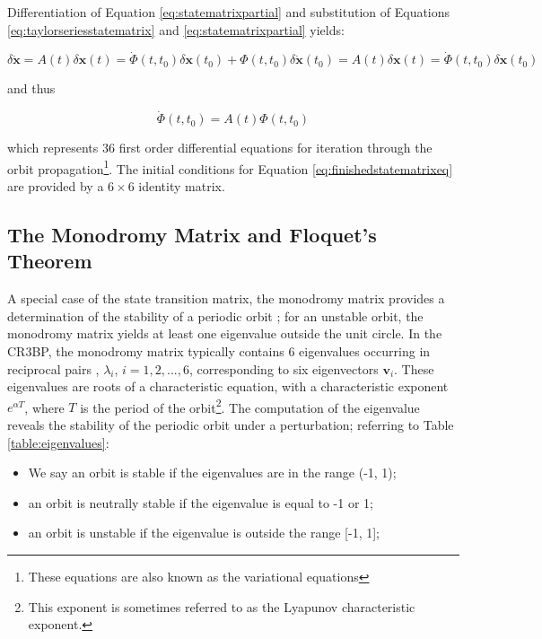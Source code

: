 \noindent Differentiation of Equation \ref{eq:statematrixpartial} and substitution of Equations \ref{eq:taylorseriesstatematrix} and \ref{eq:statematrixpartial} yields:

\begin{equation}
\delta \pmb{\dot{x}} = A \left( t \right) \delta \pmb{x} \left( t \right) = \dot{\Phi}\left(t, t_0\right) \delta \pmb{x} \left( t_0 \right) + \Phi \left(t, t_0\right) \delta\pmb{\dot{x}}\left(t_0\right) = A \left( t \right) \delta \pmb{x} \left( t \right) = \dot{\Phi}\left(t, t_0\right) \delta \pmb{x} \left( t_0 \right)
\end{equation}

\noindent and thus

\begin{equation}\label{eq:finishedstatematrixeq}
\dot{\Phi} \left( t, t_0 \right) = A\left( t\right)\Phi(t, t_0)
\end{equation}

\noindent which represents 36 first order differential equations for iteration through the orbit propagation\footnote{These equations are also known as the variational equations}. The initial conditions for Equation \ref{eq:finishedstatematrixeq} are provided by a $6\times 6$ identity matrix.

\subsection{The Monodromy Matrix and Floquet's Theorem}

A special case of the state transition matrix, the monodromy matrix provides a determination of the stability of a periodic orbit \citep{Russell2006}; for an unstable orbit, the monodromy matrix yields at least one eigenvalue outside the unit circle. In the CR3BP, the monodromy matrix typically contains 6 eigenvalues occurring in reciprocal pairs \citep{broucke1968}, $\lambda_i$, $i = 1, 2, ..., 6$, corresponding to six eigenvectors $\pmb{v}_i$. These eigenvalues are roots of a characteristic equation, with a characteristic exponent $e^{\alpha T}$, where $T$ is the period of the orbit\footnote{This exponent is sometimes referred to as the Lyapunov characteristic exponent.}. The computation of the eigenvalue reveals the stability of the periodic orbit under a perturbation; referring to Table \ref{table:eigenvalues}:

\begin{itemize}
\item We say an orbit is stable if the eigenvalues are in the range (-1, 1);
\item an orbit is neutrally stable if the eigenvalue is equal to -1 or 1;
\item an orbit is unstable if the eigenvalue is outside the range [-1, 1];
\end{itemize}


